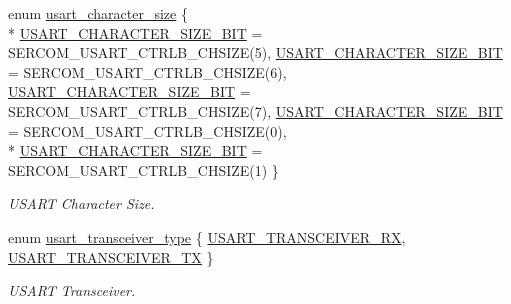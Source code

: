 \begin{DoxyCompactItemize}
$$enum \hyperlink{group__asfdoc__sam0__sercom__usart__group_ga631ce7b4f60dccd392e6d6ef7d3cd4e2}{usart\+\_\+character\+\_\+size} \{ \\*
\hyperlink{group__asfdoc__sam0__sercom__usart__group_gga631ce7b4f60dccd392e6d6ef7d3cd4e2ab1db6dc41b52d70a9185b963d9140c7f}{U\+S\+A\+R\+T\+\_\+\+C\+H\+A\+R\+A\+C\+T\+E\+R\+\_\+\+S\+I\+Z\+E\+\_\+B\+I\+T} = S\+E\+R\+C\+O\+M\+\_\+\+U\+S\+A\+R\+T\+\_\+\+C\+T\+R\+L\+B\+\_\+\+C\+H\+S\+I\+Z\+E(5), 
\hyperlink{group__asfdoc__sam0__sercom__usart__group_gga631ce7b4f60dccd392e6d6ef7d3cd4e2a4b631e89e72f2b939afbc4a996d358b9}{U\+S\+A\+R\+T\+\_\+\+C\+H\+A\+R\+A\+C\+T\+E\+R\+\_\+\+S\+I\+Z\+E\+\_\+B\+I\+T} = S\+E\+R\+C\+O\+M\+\_\+\+U\+S\+A\+R\+T\+\_\+\+C\+T\+R\+L\+B\+\_\+\+C\+H\+S\+I\+Z\+E(6), 
\hyperlink{group__asfdoc__sam0__sercom__usart__group_gga631ce7b4f60dccd392e6d6ef7d3cd4e2ab5e1a6e76a61ee79563a551ad2431726}{U\+S\+A\+R\+T\+\_\+\+C\+H\+A\+R\+A\+C\+T\+E\+R\+\_\+\+S\+I\+Z\+E\+\_\+B\+I\+T} = S\+E\+R\+C\+O\+M\+\_\+\+U\+S\+A\+R\+T\+\_\+\+C\+T\+R\+L\+B\+\_\+\+C\+H\+S\+I\+Z\+E(7), 
\hyperlink{group__asfdoc__sam0__sercom__usart__group_gga631ce7b4f60dccd392e6d6ef7d3cd4e2a8679bfe526e0d92b5d313f9f5880da4b}{U\+S\+A\+R\+T\+\_\+\+C\+H\+A\+R\+A\+C\+T\+E\+R\+\_\+\+S\+I\+Z\+E\+\_\+B\+I\+T} = S\+E\+R\+C\+O\+M\+\_\+\+U\+S\+A\+R\+T\+\_\+\+C\+T\+R\+L\+B\+\_\+\+C\+H\+S\+I\+Z\+E(0), 
\\*
\hyperlink{group__asfdoc__sam0__sercom__usart__group_gga631ce7b4f60dccd392e6d6ef7d3cd4e2a6a7fe30ecca9dbde62c154d6619cab7f}{U\+S\+A\+R\+T\+\_\+\+C\+H\+A\+R\+A\+C\+T\+E\+R\+\_\+\+S\+I\+Z\+E\+\_\+B\+I\+T} = S\+E\+R\+C\+O\+M\+\_\+\+U\+S\+A\+R\+T\+\_\+\+C\+T\+R\+L\+B\+\_\+\+C\+H\+S\+I\+Z\+E(1)
 \}
\begin{DoxyCompactList}\small\item\em U\+S\+A\+R\+T Character Size. \end{DoxyCompactList}\item 
enum \hyperlink{group__asfdoc__sam0__sercom__usart__group_gaab1b986bc581f76e99eec14ac37efe05}{usart\+\_\+transceiver\+\_\+type} \{ \hyperlink{group__asfdoc__sam0__sercom__usart__group_ggaab1b986bc581f76e99eec14ac37efe05a627832963965f11ae53299b802582c48}{U\+S\+A\+R\+T\+\_\+\+T\+R\+A\+N\+S\+C\+E\+I\+V\+E\+R\+\_\+\+R\+X}, 
\hyperlink{group__asfdoc__sam0__sercom__usart__group_ggaab1b986bc581f76e99eec14ac37efe05a9d1050c223a28be7aefcbca46a0add81}{U\+S\+A\+R\+T\+\_\+\+T\+R\+A\+N\+S\+C\+E\+I\+V\+E\+R\+\_\+\+T\+X}
 \}
\begin{DoxyCompactList}\small\item\em U\+S\+A\+R\+T Transceiver. \end{DoxyCompactList}\end{DoxyCompactItemize}
